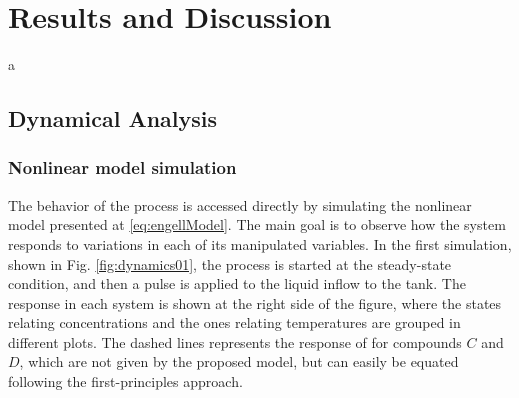 \documentclass[a4paper,11pt]{book}
\numberwithin{figure}{chapter}
\numberwithin{equation}{chapter}
\numberwithin{table}{chapter}
\theoremstyle{definition}
\begin{document}
\clearpage
\chapter{Results and Discussion}

a

\section{Dynamical Analysis}

\subsection{Nonlinear model simulation}

The behavior of the process is accessed directly by simulating the nonlinear model presented at \eqref{eq:engellModel}. The main goal is to observe how the system responds to variations in each of its manipulated variables. In the first simulation, shown in Fig. \ref{fig:dynamics01}, the process is started at the steady-state condition, and then a pulse is applied to the liquid inflow to the tank. The response in each system is shown at the right side of the figure, where the states relating concentrations and the ones relating temperatures are grouped in different plots. The dashed lines represents the response of for compounds $C$ and $D$, which are not given by the proposed model, but can easily be equated following the first-principles approach.
\end{document}

